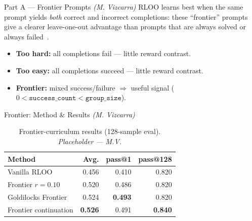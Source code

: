 \documentclass[final]{beamer}
\newlength{\colwidth}
\begin{document}
\begin{frame}[t]
\begin{columns}[t]
\begin{column}{\colwidth}
  \begin{block}{Part A — Frontier Prompts \emph{(M. Vizcarra)}}
    RLOO learns best when the same prompt yields \emph{both} correct and incorrect
    completions: these ``frontier'' prompts give a clearer leave-one-out advantage than
    prompts that are always solved or always failed~\cite{chen2025sec,parashar2025e2h}.
    \begin{itemize}
      \item \textbf{Too hard:} all completions fail — little reward contrast.
      \item \textbf{Too easy:} all completions succeed — little reward contrast.
      \item \textbf{Frontier:} mixed success/failure $\Rightarrow$ useful signal
        ($0 < \texttt{success\_count} < \texttt{group\_size}$).
    \end{itemize}
  \end{block}

  \begin{block}{Frontier: Method \& Results \emph{(M. Vizcarra)}}
    \begin{table}
      \centering
      \begin{tabular}{l r r r}
        \toprule
        \textbf{Method} & \textbf{Avg.} & \textbf{pass@1} & \textbf{pass@128} \\
        \midrule
        Vanilla RLOO         & 0.456 & 0.410 & 0.820 \\
        Frontier $r{=}0.10$  & 0.520 & 0.486 & 0.820 \\
        Goldilocks Frontier  & 0.524 & \textbf{0.493} & 0.820 \\
        Frontier continuation& \textbf{0.526} & 0.491 & \textbf{0.840} \\
        \bottomrule
      \end{tabular}
      \caption{Frontier-curriculum results (128-sample eval). \emph{Placeholder — M.V.}}
    \end{table}
  \end{block}


\end{column}
\end{columns}
\end{frame}
\end{document}
